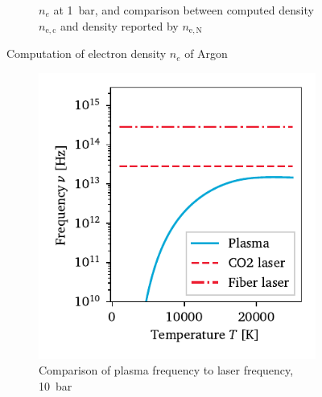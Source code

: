 \begin{figure}[h]
\begin{subfigure}[t]{3.2in}
                \caption{$n_e$ at \qty{1}{bar}, and comparison between computed density $n_\mathrm{e, c}$ and density reported by \textcite{nassarInvestigationLasersustainedPlasma2012} $n_\mathrm{e, N}$}
                \label{fig:e_density_curves}
            \end{subfigure}
            \caption{Computation of electron density $n_e$ of Argon}
            \label{fig:e_density}
        \end{figure}

        \begin{figure}[h]
            \centering
            \begin{subfigure}[t]{2.9in}
                \centering
                \includegraphics[]{assets/4 models/frequency_comparison.pdf}
                \caption{Comparison of plasma frequency to laser frequency, \qty{10}{bar}}
                \label{fig:coulomb_freq}
            \end{subfigure}
            \hfill
            \begin{subfigure}[t]{2.9in}
                \centering

\end{subfigure}
\end{figure}
